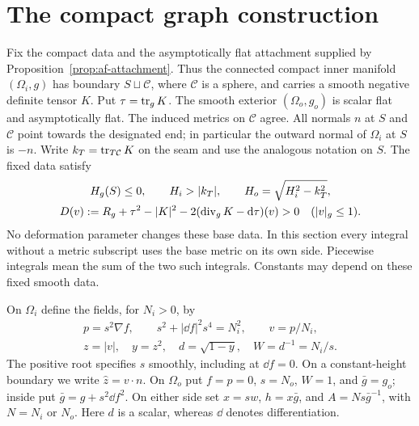 \section{The compact graph construction}\label{sec:compact-construction}

Fix the compact data and the asymptotically flat attachment supplied by
Proposition~\ref{prop:af-attachment}. Thus the connected compact inner
manifold $(\Omega_i,g)$ has boundary $S\sqcup\mathcal C$, where
$\mathcal C$ is a sphere, and carries a smooth negative definite tensor
$K$. Put $\tau=\operatorname{tr}_g K$. The smooth exterior $(\Omega_o,g_o)$ is scalar
flat and asymptotically flat. The induced metrics on $\mathcal C$ agree.
All normals $n$ at $S$ and $\mathcal C$ point towards the designated end;
in particular the outward normal of $\Omega_i$ at $S$ is $-n$. Write
$k_T=\operatorname{tr}_{T\mathcal C}K$ on the seam and use the analogous notation on
$S$. The fixed data satisfy
\begin{equation}\label{eq:compact-base-data}
 \begin{gathered}
 H_g(S)\le0,\qquad H_i>|k_T|,\qquad
 H_o=\sqrt{H_i^2-k_T^2},\\
 D(v):=R_g+\tau^2-|K|^2-2(\operatorname{div}_gK-\mathop{}\!\mathrm d\tau)(v)>0
 \quad (|v|_g\le1).
 \end{gathered}
\end{equation}
No deformation parameter changes these base data. In this section every
integral without a metric subscript uses the base metric on its own side.
Piecewise integrals mean the sum of the two such integrals. Constants may
depend on these fixed smooth data.

On $\Omega_i$ define the fields, for $N_i>0$, by
\begin{equation}\label{eq:compact-constitutive}
 \begin{gathered}
 p=s^2\nabla f,\qquad s^2+|\dd f|^2s^4=N_i^2,\qquad v=p/N_i,\\
 z=|v|,\quad y=z^2,\quad d=\sqrt{1-y},\quad W=d^{-1}=N_i/s.
 \end{gathered}
\end{equation}
The positive root specifies $s$ smoothly, including at $\dd f=0$.
On a constant-height boundary we write $\widehat z=v\cdot n$.
On $\Omega_o$ put $f=p=0$, $s=N_o$, $W=1$, and $\bar g=g_o$;
inside put $\bar g=g+s^2\dd f^2$. On either side set
$x=sw$, $h=x\bar g$, and $A=Ns\bar g^{-1}$, with $N=N_i$ or $N_o$.
Here $d$ is a scalar, whereas $\dd$ denotes differentiation.

